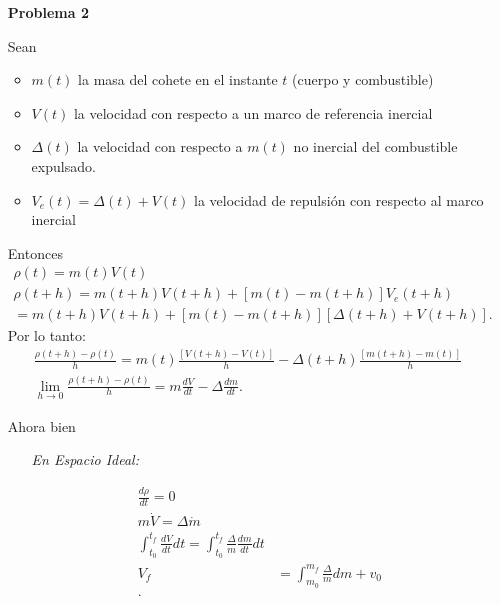 \documentclass[12pt]{exam}
\begin{document}
\begin{enumerate}
  \item[\textbf{Problema 2}]

    Sean
    \begin{itemize}
      \item $m\left( t \right) $ la masa del cohete en el instante $t$ (cuerpo y combustible)
      \item $V\left( t \right) $ la velocidad con respecto a un marco de  referencia inercial
      \item $\Delta \left( t \right) $ la velocidad con respecto a $m\left( t \right) $ no inercial del combustible expulsado.
      \item $V_{e}\left( t \right) =\Delta\left( t \right) +V\left( t \right) $ la velocidad de repulsión con respecto al marco inercial
    \end{itemize}

    Entonces
    \begin{align*}
      \rho \left( t \right) =m\left( t \right) V\left( t \right) \\
      \rho \left( t+h \right) = m\left( t+h \right) V\left( t+h \right) + \left[ m\left( t \right) - m\left( t+h \right)  \right] V_{e}\left( t+h \right) \\
      = m\left( t+h \right) V\left( t+h \right) +\left[ m\left( t \right) -m\left( t+h \right)  \right] \left[ \Delta\left( t+h \right) +V\left( t+h \right)  \right] 
    .\end{align*}
    Por lo tanto:
    \begin{align*}
     \frac{\rho\left( t+h \right) - \rho\left( t \right) }{h} = m\left( t \right) \frac{\left[ V\left( t+h \right) - V\left( t \right)  \right] }{h}- \Delta\left( t+h \right) \frac{\left[ m\left( t+h \right) -m\left( t \right)  \right] }{h}\\
     \lim_{h \to 0} \frac{\rho\left( t+h \right) -\rho\left( t \right) }{h} = m \frac{dV}{dt}-\Delta \frac{dm}{dt}
    .\end{align*}

    Ahora bien
    \begin{enumerate}
      \item[\textit{En Espacio Ideal:}]

	\begin{align*}
	  \frac{d\rho}{dt}=0\\
	  m\dot{V} = \Delta\dot{m}\\
	  \int_{t_0}^{t_f}\frac{dV}{dt}dt = \int_{t_0}^{t_f}\frac{\Delta}{m}\frac{dm}{dt}dt\\
	  V_{f} &= \int_{m_0}^{m_{f}} \frac{\Delta}{m}dm + v_{0} \\
	.\end{align*}


\end{enumerate}
\end{enumerate}
\end{document}
